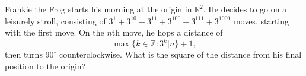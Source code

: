 Frankie the Frog starts his morning at the origin in $\mathbb{R}^2$. He decides to go on a leisurely stroll, consisting of $3^1+3^{10}+3^{11}+3^{100}+3^{111}+3^{1000}$ moves, starting with the first move. On the $n$th move, he hops a distance of$$\max\{k\in\mathbb{Z}:3^k|n\}+1,$$then turns $90^{\circ}$ counterclockwise. What is the square of the distance from his final position to the origin?